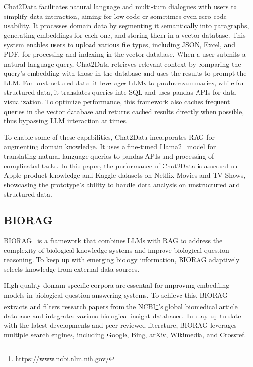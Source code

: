 \documentclass{DESSThesis}
\begin{document}
Chat2Data facilitates natural language and multi-turn dialogues with users to simplify data interaction, aiming for low-code or sometimes even zero-code usability. It processes domain data by segmenting it semantically into paragraphs, generating embeddings for each one, and storing them in a vector database. This system enables users to upload various file types, including JSON, Excel, and PDF, for processing and indexing in the vector database. When a user submits a natural language query, Chat2Data retrieves relevant context by comparing the query's embedding with those in the database and uses the results to prompt the LLM. For unstructured data, it leverages LLMs to produce summaries, while for structured data, it translates queries into SQL and uses pandas APIs for data visualization. To optimize performance, this framework also caches frequent queries in the vector database and returns cached results directly when possible, thus bypassing LLM interaction at times.

To enable some of these capabilities, Chat2Data incorporates RAG for augmenting domain knowledge. It uses a fine-tuned Llama2~\cite{touvron2023llama2openfoundation} model for translating natural language queries to pandas APIs and processing of complicated tasks. In this paper, the performance of Chat2Data is assessed on Apple product knowledge and Kaggle datasets on Netflix Movies and TV Shows, showcasing the prototype's ability to handle data analysis on unstructured and structured data.

\subsection{BIORAG}

BIORAG~\cite{wang2024bioragragllmframeworkbiological} is a framework that combines LLMs with RAG to address the complexity of biological knowledge systems and improve biological question reasoning. To keep up with emerging biology information, BIORAG adaptively selects knowledge from external data sources.

High-quality domain-specific corpora are essential for improving embedding models in biological question-answering systems. To achieve this, BIORAG extracts and filters research papers from the NCBI\footnote{\url{https://www.ncbi.nlm.nih.gov/}}'s global biomedical article database and integrates various biological insight databases. To stay up to date with the latest developments and peer-reviewed literature, BIORAG leverages multiple search engines, including Google, Bing, arXiv, Wikimedia, and Crossref.
\end{document}
